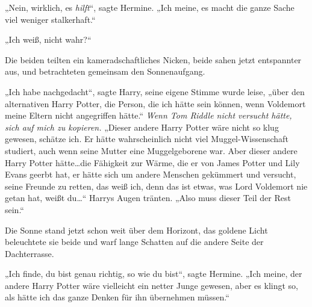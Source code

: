 „Nein, wirklich, es \emph{hilft}“, sagte Hermine. „Ich meine, es macht die ganze Sache viel weniger stalkerhaft.“

„Ich weiß, nicht wahr?“

Die beiden teilten ein kameradschaftliches Nicken, beide sahen jetzt entspannter aus, und betrachteten gemeinsam den Sonnenaufgang.

„Ich habe nachgedacht“, sagte Harry, seine eigene Stimme wurde leise, „über den alternativen Harry Potter, die Person, die ich hätte sein können, wenn Voldemort meine Eltern nicht angegriffen hätte.“
\emph{Wenn Tom Riddle nicht versucht hätte, sich auf mich zu kopieren.}
„Dieser andere Harry Potter wäre nicht so klug gewesen, schätze ich. Er hätte wahrscheinlich nicht viel Muggel-Wissenschaft studiert, auch wenn seine Mutter eine Muggelgeborene war. Aber dieser andere Harry Potter hätte…die Fähigkeit zur Wärme, die er von James Potter und Lily Evans geerbt hat, er hätte sich um andere Menschen gekümmert und versucht, seine Freunde zu retten, das weiß ich, denn das ist etwas, was Lord Voldemort nie getan hat, weißt du…“
Harrys Augen tränten.
„Also muss dieser Teil der Rest sein.“

Die Sonne stand jetzt schon weit über dem Horizont, das goldene Licht beleuchtete sie beide und warf lange Schatten auf die andere Seite der Dachterrasse.

„Ich finde, du bist genau richtig, so wie du bist“, sagte Hermine. „Ich meine, der andere Harry Potter wäre vielleicht ein netter Junge gewesen, aber es klingt so, als hätte ich das ganze Denken für ihn übernehmen müssen.“

